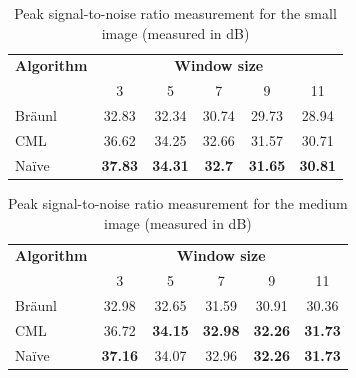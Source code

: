 \begin{table}
\centering
\caption{Peak signal-to-noise ratio measurement for the small image (measured in dB)}
\label{tab:psnrsmall}
\begin{tabular}{@{}lccccc@{}}
\toprule
\multicolumn{1}{c}{\textbf{Algorithm}} & \multicolumn{5}{c}{\textbf{Window size}}                                          \\
                                       & 3              & 5              & 7             & 9              & 11             \\ \midrule
Bräunl                                 & 32.83          & 32.34          & 30.74         & 29.73          & 28.94          \\
CML                                    & 36.62          & 34.25          & 32.66         & 31.57          & 30.71          \\
Naïve                                  & \textbf{37.83} & \textbf{34.31} & \textbf{32.7} & \textbf{31.65} & \textbf{30.81} \\ \bottomrule
\end{tabular}
\end{table}

\begin{table}
\centering
\caption{Peak signal-to-noise ratio measurement for the medium image (measured in dB)}
\begin{tabular}{@{}lccccc@{}}
\toprule
\multicolumn{1}{c}{\textbf{Algorithm}} & \multicolumn{5}{c}{\textbf{Window size}}                                           \\
                                       & 3              & 5              & 7              & 9              & 11             \\ \midrule
Bräunl                                 & 32.98          & 32.65          & 31.59          & 30.91          & 30.36          \\
CML                                    & 36.72          & \textbf{34.15} & \textbf{32.98} & \textbf{32.26} & \textbf{31.73} \\
Naïve                                  & \textbf{37.16} & 34.07          & 32.96          & \textbf{32.26} & \textbf{31.73} \\ \bottomrule
\end{tabular}
\label{tab:psnrmedium}
\end{table}

